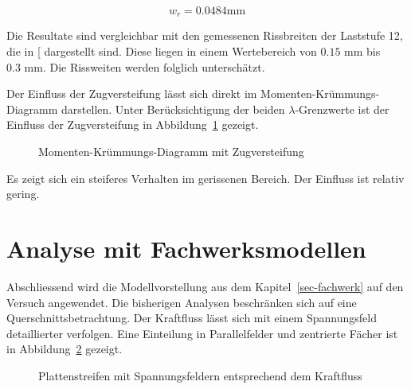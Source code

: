 \documentclass[
  12pt,
  letterpaper,
  egregdoesnotlikesansseriftitles]{scrreprt}
\begin{document}
\begin{equation}w_{r} = 0.0484 \text{mm}\end{equation}

Die Resultate sind vergleichbar mit den gemessenen Rissbreiten der
Laststufe 12, die in {[}\citeproc{ref-Jaeger2006}{1}{]} dargestellt
sind. Diese liegen in einem Wertebereich von \(0.15 \text{ mm}\) bis
\(0.3 \text{ mm}\). Die Rissweiten werden folglich unterschätzt.

Der Einfluss der Zugversteifung lässt sich direkt im
Momenten-Krümmungs-Diagramm darstellen. Unter Berücksichtigung der
beiden \(\lambda\)-Grenzwerte ist der Einfluss der Zugversteifung in
Abbildung~\ref{fig-mchi_diagramm_zugversteifung} gezeigt.

\begin{figure}[H]


\caption{\label{fig-mchi_diagramm_zugversteifung}Momenten-Krümmungs-Diagramm
mit Zugversteifung}

\end{figure}%

Es zeigt sich ein steiferes Verhalten im gerissenen Bereich. Der
Einfluss ist relativ gering.

\section{Analyse mit
Fachwerksmodellen}\label{analyse-mit-fachwerksmodellen}

Abschliessend wird die Modellvorstellung aus dem
Kapitel~\ref{sec-fachwerk} auf den Versuch angewendet. Die bisherigen
Analysen beschränken sich auf eine Querschnittsbetrachtung. Der
Kraftfluss lässt sich mit einem Spannungsfeld detaillierter verfolgen.
Eine Einteilung in Parallelfelder und zentrierte Fächer ist in
Abbildung~\ref{fig-spannungsfelder_flach} gezeigt.

\begin{figure}[H]


\caption{\label{fig-spannungsfelder_flach}Plattenstreifen mit
Spannungsfeldern entsprechend dem Kraftfluss}

\end{figure}%
\end{document}
